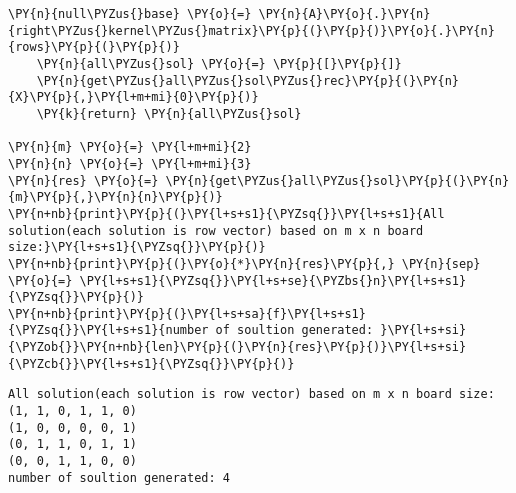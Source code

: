 \begin{english}
\begin{tcolorbox}[breakable, size=fbox, boxrule=1pt, pad at break*=1mm,colback=cellbackground, colframe=cellborder]
\begin{Verbatim}[commandchars=\\\{\}]
    \PY{n}{null\PYZus{}base} \PY{o}{=} \PY{n}{A}\PY{o}{.}\PY{n}{right\PYZus{}kernel\PYZus{}matrix}\PY{p}{(}\PY{p}{)}\PY{o}{.}\PY{n}{rows}\PY{p}{(}\PY{p}{)}
    \PY{n}{all\PYZus{}sol} \PY{o}{=} \PY{p}{[}\PY{p}{]}
    \PY{n}{get\PYZus{}all\PYZus{}sol\PYZus{}rec}\PY{p}{(}\PY{n}{X}\PY{p}{,}\PY{l+m+mi}{0}\PY{p}{)}
    \PY{k}{return} \PY{n}{all\PYZus{}sol}

\PY{n}{m} \PY{o}{=} \PY{l+m+mi}{2}
\PY{n}{n} \PY{o}{=} \PY{l+m+mi}{3}
\PY{n}{res} \PY{o}{=} \PY{n}{get\PYZus{}all\PYZus{}sol}\PY{p}{(}\PY{n}{m}\PY{p}{,}\PY{n}{n}\PY{p}{)}
\PY{n+nb}{print}\PY{p}{(}\PY{l+s+s1}{\PYZsq{}}\PY{l+s+s1}{All solution(each solution is row vector) based on m x n board size:}\PY{l+s+s1}{\PYZsq{}}\PY{p}{)}
\PY{n+nb}{print}\PY{p}{(}\PY{o}{*}\PY{n}{res}\PY{p}{,} \PY{n}{sep} \PY{o}{=} \PY{l+s+s1}{\PYZsq{}}\PY{l+s+se}{\PYZbs{}n}\PY{l+s+s1}{\PYZsq{}}\PY{p}{)}
\PY{n+nb}{print}\PY{p}{(}\PY{l+s+sa}{f}\PY{l+s+s1}{\PYZsq{}}\PY{l+s+s1}{number of soultion generated: }\PY{l+s+si}{\PYZob{}}\PY{n+nb}{len}\PY{p}{(}\PY{n}{res}\PY{p}{)}\PY{l+s+si}{\PYZcb{}}\PY{l+s+s1}{\PYZsq{}}\PY{p}{)}
\end{Verbatim}
\end{tcolorbox}

    \begin{Verbatim}[commandchars=\\\{\}]
All solution(each solution is row vector) based on m x n board size:
(1, 1, 0, 1, 1, 0)
(1, 0, 0, 0, 0, 1)
(0, 1, 1, 0, 1, 1)
(0, 0, 1, 1, 0, 0)
number of soultion generated: 4
    \end{Verbatim}
\end{english}


